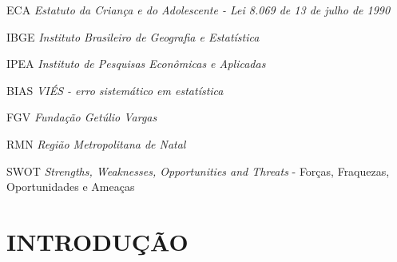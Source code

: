 \documentclass[
	12pt,				%
	openright,			%
	twoside,			%
	a4paper,			%
	chapter=TITLE,		%
	section=TITLE,		%
	subsection=TITLE,	%
	subsubsection=TITLE,%
	spanish,            %
	english,			%
	brazil				%
	]{abntex2}
\begin{document}
\begin{siglas}
	\item[ECA] \emph{Estatuto da Criança e do Adolescente - Lei 8.069 de 13 de julho de 1990}
	\item[IBGE] \emph{Instituto Brasileiro de Geografia e Estatística}
	\item[IPEA] \emph{Instituto de Pesquisas Econômicas e Aplicadas}
  \item[BIAS] \emph{VIÉS - erro sistemático em estatística}
  \item[FGV] \emph{Fundação Getúlio Vargas}
  \item[RMN] \emph{Região Metropolitana de Natal}
    \item[SWOT] \emph{Strengths, Weaknesses, Opportunities and Threats} - Forças, Fraquezas, Oportunidades
  e Ameaças
 \end{siglas}

\tableofcontents*
\cleardoublepage
\textual

\chapter*{INTRODUÇÃO}
\end{document}
